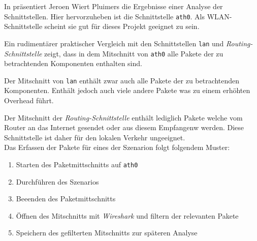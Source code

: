 In \cite{fritzcap8:online} präsentiert Jeroen Wiert Pluimers die Ergebnisse einer Analyse der Schnittstellen.
Hier hervorzuheben ist die Schnittstelle \texttt{ath0}. Als WLAN-Schnittstelle scheint sie gut für dieses Projekt geeignet zu sein.

Ein rudimentärer praktischer Vergleich mit den Schnittstellen \texttt{lan} und \textit{Routing-Schnittstelle} zeigt,
dass in dem Mitschnitt von \texttt{ath0} alle Pakete der zu betrachtenden Komponenten enthalten sind.

Der Mitschnitt von \texttt{lan} enthält zwar auch alle Pakete der zu betrachtenden Komponenten.
Enthält jedoch auch viele andere Pakete was zu einem erhöhten Overhead führt.

Der Mitschnitt der \textit{Routing-Schnittstelle} enthält lediglich Pakete welche vom Router an das Internet gesendet oder aus diesem Empfangenw werden.
Diese Schnittstelle ist daher für den lokalen Verkehr ungeeignet.\\

Das Erfassen der Pakete für eines der Szenarion folgt folgendem Muster:
\begin{enumerate}
    \setlength\itemsep{-0.5em}
    \item Starten des Paketmittschnitts auf \texttt{ath0}
    \item Durchführen des Szenarios
    \item Beeenden des Paketmittschnitts
    \item Öffnen des Mitschnitts mit \textit{Wireshark} und filtern der relevanten Pakete
    \item Speichern des gefilterten Mitschnitts zur späteren Analyse
\end{enumerate}